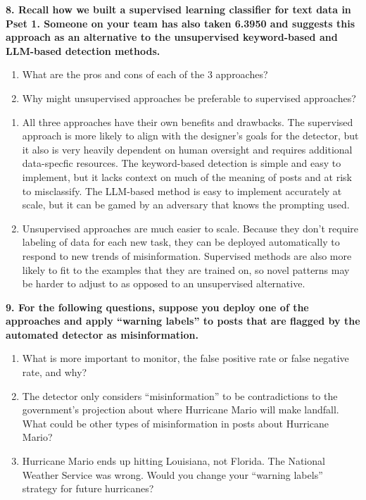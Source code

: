 \documentclass{article}
\begin{document}
\textbf{8. Recall how we built a supervised learning classifier for text data in Pset 1. Someone on your team has also taken 6.3950 and suggests this approach as an alternative to the unsupervised keyword-based and LLM-based detection methods.}
\begin{enumerate}[label=\Alph*.]
\item What are the pros and cons of each of the 3 approaches?
\item Why might unsupervised approaches be preferable to supervised approaches? 
\end{enumerate}
\bigskip
\begin{mdframed}
\begin{enumerate}[label=\Alph*.]
 \item All three approaches have their own benefits and drawbacks. The supervised approach is more likely to align with the designer's goals for the detector, but it also is very heavily dependent on human oversight and requires additional data-specfic resources. The keyword-based detection is simple and easy to implement, but it lacks context on much of the meaning of posts and at risk to misclassify. The LLM-based method is easy to implement accurately at scale, but it can be gamed by an adversary that knows the prompting used.
\item Unsupervised approaches are much easier to scale. Because they don't require labeling of data for each new task, they can be deployed automatically to respond to new trends of misinformation. Supervised methods are also more likely to fit to the examples that they are trained on, so novel patterns may be harder to adjust to as opposed to an unsupervised alternative. 
\end{enumerate}
\end{mdframed}
\bigskip



\textbf{9. For the following questions, suppose you deploy one of the approaches and apply ``warning labels'' to posts that are flagged by the automated detector as misinformation. } 
\begin{enumerate}[label=\Alph*.]
\item What is more important to monitor, the false positive rate or false negative rate, and why?
\item The detector only considers ``misinformation'' to be contradictions to the government's projection about where Hurricane Mario will make landfall. What could be other types of misinformation in posts about Hurricane Mario?
\item Hurricane Mario ends up hitting Louisiana, not Florida. The National Weather Service was wrong. Would you change your ``warning labels'' strategy for future hurricanes?
\end{enumerate}
\end{document}
